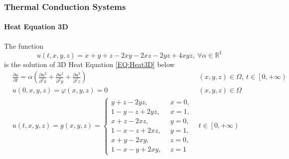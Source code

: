 \begin{frame}
  \frametitle{Thermal Conduction Systems}
  \framesubtitle{Heat Equation 3D}
  \vspace*{-0.3em}
  \begin{block}{}
    The function
    \begin{equation}
      u(t,x,y,z) = x + y + z - 2xy - 2xz - 2yz + 4xyz, \:\forall \alpha \in \mathbb{R}^1
    \end{equation}
    is the solution of 3D Heat Equation \ref{EQ:Heat3D} below
    \begin{align}\label{EQ:Heat3D}
      &\frac{\partial u}{\partial t} = \alpha \left(
        \frac{\partial u^2}{\partial^2 x}
        +
        \frac{\partial u^2}{\partial^2 y}
        +
        \frac{\partial u^2}{\partial^2 z}
      \right) & (x,y, z) \in \Omega, \: t \in \left[0, +\infty\right) 
                                                                      \nonumber\\
      &u(0,x,y,z)  = \varphi(x,y,z) = 0 &(x,y,z) \in \Omega\\
      &  u(t,x,y,z) = g(x,y,z) = 
      \begin{cases}
        y+z -2yz        , \:\: &x=0,\\
        1 - y - z + 2yz , \:\: &x=1,\\
        x+z - 2xz       , \:\: &y=0,\\
        1 - x - z + 2xz , \:\: &y =1,\\
        x+y - 2xy       , \:\: &z=0,\\
        1 - x - y + 2xy , \:\: &z=1
      \end{cases}
      &t \in \left[0, +\infty\right) \nonumber
    \end{align}
  \end{block}
\end{frame}
